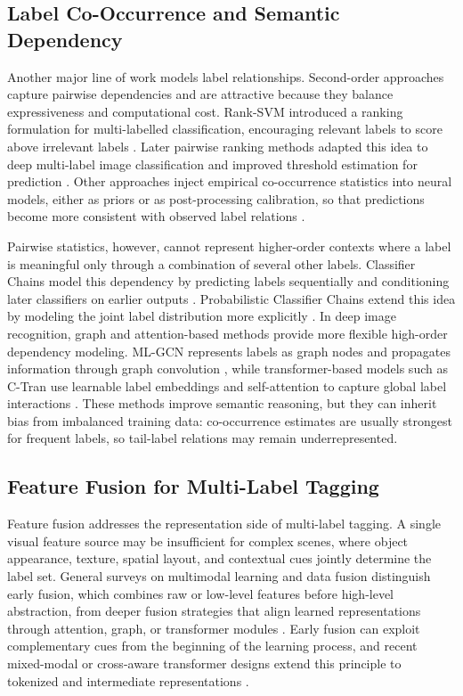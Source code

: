 \documentclass[10pt,journal,compsoc]{IEEEtran}
\begin{document}
\subsection{Label Co-Occurrence and Semantic Dependency}

Another major line of work models label relationships. Second-order approaches capture pairwise dependencies and are attractive because they balance expressiveness and computational cost. Rank-SVM introduced a ranking formulation for multi-labelled classification, encouraging relevant labels to score above irrelevant labels \cite{elisseeff2001kernel}. Later pairwise ranking methods adapted this idea to deep multi-label image classification and improved threshold estimation for prediction \cite{li2017improving}. Other approaches inject empirical co-occurrence statistics into neural models, either as priors or as post-processing calibration, so that predictions become more consistent with observed label relations \cite{yao2019incorporating,rawlekar2024improving,zhu2023scene}.

Pairwise statistics, however, cannot represent higher-order contexts where a label is meaningful only through a combination of several other labels. Classifier Chains model this dependency by predicting labels sequentially and conditioning later classifiers on earlier outputs \cite{read2009classifier}. Probabilistic Classifier Chains extend this idea by modeling the joint label distribution more explicitly \cite{cheng2010bayes}. In deep image recognition, graph and attention-based methods provide more flexible high-order dependency modeling. ML-GCN represents labels as graph nodes and propagates information through graph convolution \cite{chen2019multi}, while transformer-based models such as C-Tran use learnable label embeddings and self-attention to capture global label interactions \cite{lanchantin2021general}. These methods improve semantic reasoning, but they can inherit bias from imbalanced training data: co-occurrence estimates are usually strongest for frequent labels, so tail-label relations may remain underrepresented.

\subsection{Feature Fusion for Multi-Label Tagging}

Feature fusion addresses the representation side of multi-label tagging. A single visual feature source may be insufficient for complex scenes, where object appearance, texture, spatial layout, and contextual cues jointly determine the label set. General surveys on multimodal learning and data fusion distinguish early fusion, which combines raw or low-level features before high-level abstraction, from deeper fusion strategies that align learned representations through attention, graph, or transformer modules \cite{baltrusaitis2018multimodal,meng2020survey,gao2020survey,guo2019deep}. Early fusion can exploit complementary cues from the beginning of the learning process, and recent mixed-modal or cross-aware transformer designs extend this principle to tokenized and intermediate representations \cite{chameleon2024,cho2023cross,lin2024moma}.
\end{document}
